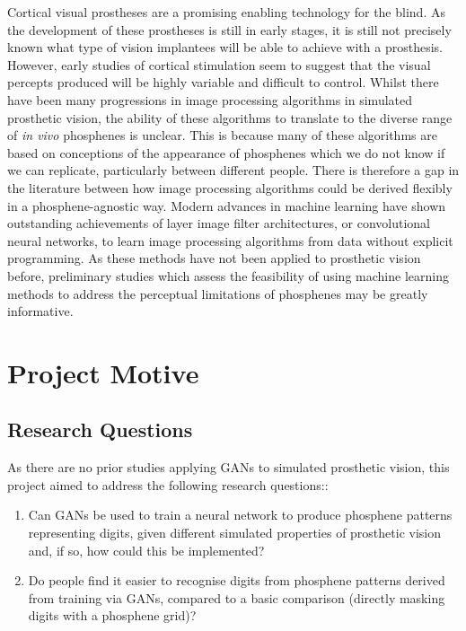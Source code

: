 \documentclass[a4paper,11pt,openany]{book}
\begin{document}
Cortical visual prostheses are a promising enabling technology for the blind.
As the development of these prostheses is still in early stages, it is still not precisely known what type of vision implantees will be able to achieve with a prosthesis.
However, early studies of cortical stimulation seem to suggest that the visual percepts produced will be highly variable and difficult to control.
Whilst there have been many progressions in image processing algorithms in simulated prosthetic vision, the ability of these algorithms to translate to the diverse range of \emph{in vivo} phosphenes is unclear.
This is because many of these algorithms are based on conceptions of the appearance of phosphenes which we do not know if we can replicate, particularly between different people.
There is therefore a gap in the literature between how image processing algorithms could be derived flexibly in a phosphene-agnostic way.
Modern advances in machine learning have shown outstanding achievements of layer image filter architectures, or convolutional neural networks, to learn image processing algorithms from data without explicit programming.
As these methods have not been applied to prosthetic vision before, preliminary studies which assess the feasibility of using machine learning methods to address the perceptual limitations of phosphenes may be greatly informative.

\chapter{Project Motive}
\label{sec:orga129e02}

\section*{Research Questions}
\label{sec:org1046267}

As there are no prior studies applying GANs to simulated prosthetic vision, this project aimed to address the following research questions::

\begin{enumerate}
\item Can GANs be used to train a neural network to produce phosphene patterns representing digits, given different simulated properties of prosthetic vision and, if so, how could this be implemented?
\item Do people find it easier to recognise digits from phosphene patterns derived from training via GANs, compared to a basic comparison (directly masking digits with a phosphene grid)?
\end{enumerate}
\end{document}
